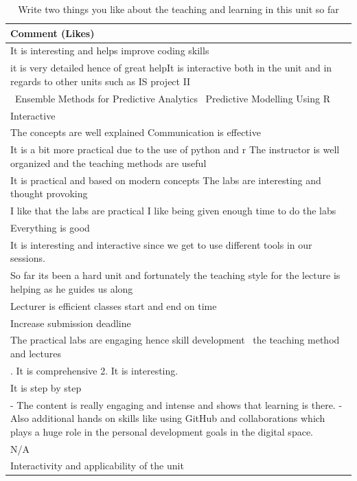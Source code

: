 \documentclass[
]{article}
\begin{document}
\begin{longtable}[t]{>{\raggedright\arraybackslash}p{35em}}
\caption{\label{tab:RawLikesData}Write two things you like about the teaching and learning in this unit so far}\\
\toprule
Comment (Likes)\\
\midrule
It is interesting and helps improve coding skills\\
\hline
it is very detailed hence of great helpIt is interactive both in the unit and in regards to other units such as IS project II\\
\hline
 Ensemble Methods for Predictive Analytics   Predictive Modelling Using R \\
\hline
Interactive\\
\hline
The concepts are well explained  Communication is effective \\
\hline
It is a bit more practical due to the use of python and r  The instructor is well organized and the teaching methods are useful\\
\hline
It is practical and based on modern concepts  The labs are interesting and thought provoking\\
\hline
I like that the labs are practical  I like being given enough time to do the labs\\
\hline
Everything is good\\
\hline
It is interesting and interactive since we get to use different tools in our sessions.\\
\hline
So far its been a hard unit and fortunately the teaching style for the lecture is helping as he guides us along \\
\hline
Lecturer is efficient  classes start and end on time\\
\hline
Increase submission deadline \\
\hline
The practical labs are engaging hence skill development   the teaching method and lectures \\
\hline
1. It is comprehensive  2. It is interesting.\\
\hline
It is step by step   \\
\hline
- The content is really engaging and intense and shows that learning is there.  - Also additional hands on skills like using GitHub and collaborations which plays a huge role in the personal development goals in the digital space. \\
\hline
N/A\\
\hline
Interactivity and applicability of the unit\\

\end{longtable}
\end{document}
